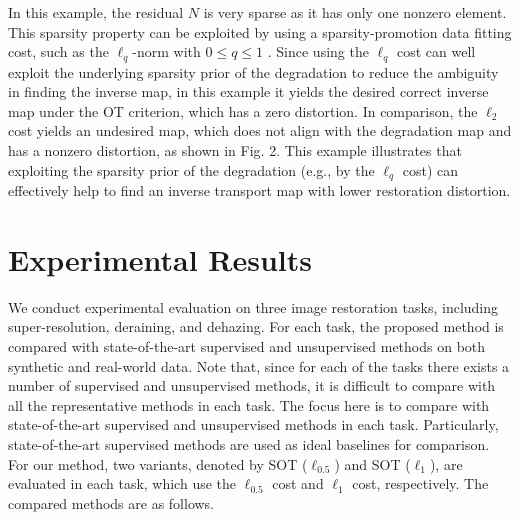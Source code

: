 \documentclass[10pt,journal,compsoc]{IEEEtran}
\begin{document}
In this example, the residual $N$ is very sparse as it has only
one nonzero element. This sparsity property can be exploited by
using a sparsity-promotion data fitting cost, such as the $\ell_q$-norm
with $0\leq q \leq 1$ \cite{lq,wen2016robust}. Since using the $\ell_q$ cost
can well exploit the underlying sparsity prior of the degradation
to reduce the ambiguity in finding the inverse map, in this example
it yields the desired correct inverse map under the OT criterion,
which has a zero distortion. In comparison, the $\ell_2$ cost yields
an undesired map, which does not align with the degradation map and
has a nonzero distortion, as shown in Fig. 2.  This example illustrates
that exploiting the sparsity prior of the degradation (e.g., by the
$\ell_q$ cost) can effectively help to find an inverse transport map
with lower restoration distortion.

\section{Experimental Results}

We conduct experimental evaluation on three image restoration tasks, 
including super-resolution, deraining, and dehazing. For each task, 
the proposed method is compared with state-of-the-art supervised and 
unsupervised methods on both synthetic and real-world data.
Note that, since for each of the tasks there exists a number of
supervised and unsupervised methods, it is difficult to compare with 
all the representative methods in each task. The focus here is to 
compare with state-of-the-art supervised and unsupervised methods
in each task. Particularly, state-of-the-art supervised
methods are used as ideal baselines for comparison.
For our method, two variants, denoted by SOT ($\ell_{0.5}$) and SOT ($\ell_1$), 
are evaluated in each task, which use the $\ell_{0.5}$ cost and $\ell_{1}$ cost, respectively.
The compared methods are as follows.
\end{document}

